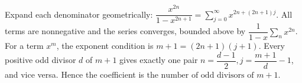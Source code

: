 Expand each denominator geometrically: $\dfrac{x^{2n}}{1-x^{2n+1}}=\sum_{j=0}^\infty x^{2n+(2n+1)j}$. All terms are nonnegative and the series converges, bounded above by $\dfrac{1}{1-x}\sum_nx^{2n}$. For a term $x^m$, the exponent condition is $m+1=(2n+1)(j+1)$. Every positive odd divisor $d$ of $m+1$ gives exactly one pair $n = \dfrac{d-1}{2} , j = \dfrac{m+1}{d} - 1$, and vice versa. Hence the coefficient is $\boxed{\text{the number of odd divisors of }m+1}$.
